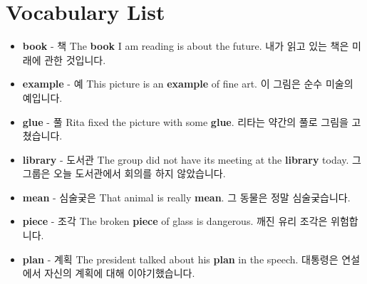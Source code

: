 \documentclass{article}
\begin{document}
\renewcommand{\familydefault}{\sfdefault}
\onehalfspacing

\section*{Vocabulary List}
\begin{addmargin}[1em]{1em}
    \begin{itemize}
        \item \fontsize{12pt}{14pt}\selectfont \textbf{book} - 책 \newline
        The \textbf{book} I am reading is about the future. \newline
        내가 읽고 있는 책은 미래에 관한 것입니다.
        
        \item \fontsize{12pt}{14pt}\selectfont \textbf{example} - 예 \newline
        This picture is an \textbf{example} of fine art. \newline
        이 그림은 순수 미술의 예입니다.
        
        \item \fontsize{12pt}{14pt}\selectfont \textbf{glue} - 풀 \newline
        Rita fixed the picture with some \textbf{glue}. \newline
        리타는 약간의 풀로 그림을 고쳤습니다.
        
        \item \fontsize{12pt}{14pt}\selectfont \textbf{library} - 도서관 \newline
        The group did not have its meeting at the \textbf{library} today. \newline
        그 그룹은 오늘 도서관에서 회의를 하지 않았습니다.
        
        \item \fontsize{12pt}{14pt}\selectfont \textbf{mean} - 심술궂은 \newline
        That animal is really \textbf{mean}. \newline
        그 동물은 정말 심술궂습니다.
        
        \item \fontsize{12pt}{14pt}\selectfont \textbf{piece} - 조각 \newline
        The broken \textbf{piece} of glass is dangerous. \newline
        깨진 유리 조각은 위험합니다.
        
        \item \fontsize{12pt}{14pt}\selectfont \textbf{plan} - 계획 \newline
        The president talked about his \textbf{plan} in the speech. \newline
        대통령은 연설에서 자신의 계획에 대해 이야기했습니다.
        

\end{itemize}
\end{addmargin}
\end{document}
